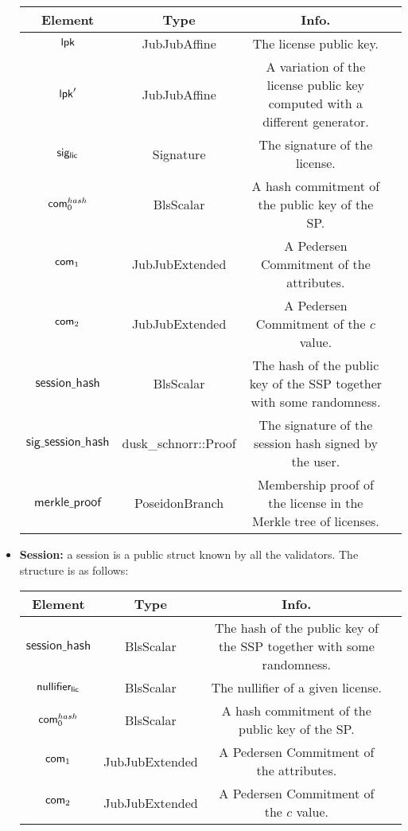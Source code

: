 \begin{itemize}
    \begin{center}
        \begin{tabular}{ |c|c|c|c| } 
        \hline
        \textbf{Element} & \textbf{Type} & \textbf{Info.} \\
        \hline
        $\mathsf{lpk}$ & JubJubAffine & The license public key.\\ 
        $\mathsf{lpk}'$ & JubJubAffine & A variation of the license public key computed with a different generator.\\ 
        $\mathsf{sig_{lic}}$ & Signature & The signature of the license. \\ 
        $\mathsf{com}_0^{hash}$ & BlsScalar & A hash commitment of the public key of the SP. \\ 
        $\mathsf{com}_1$ & JubJubExtended & A Pedersen Commitment of the attributes. \\ 
        $\mathsf{com}_2$ & JubJubExtended & A Pedersen Commitment of the $c$ value. \\ 
        $\mathsf{session\_hash}$ & BlsScalar & The hash of the public key of the SSP together with some randomness. \\ 
        $\mathsf{sig\_session\_hash}$ & dusk\_schnorr::Proof & The signature of the session hash signed by the user. \\ 
        $\mathsf{merkle\_proof}$ & PoseidonBranch & Membership proof of the license in the Merkle tree of licenses. \\ 

        \hline
        \end{tabular}
    \end{center}

    \item \textbf{Session:} a session is a public struct known by all the validators. The structure is as follows:

    \begin{center}
        \begin{tabular}{ |c|c|c|c| } 
        \hline
        \textbf{Element} & \textbf{Type} & \textbf{Info.} \\
        \hline
        $\mathsf{session\_hash}$ & BlsScalar & The hash of the public key of the SSP together with some randomness. \\ 
        $\mathsf{nullifier_{lic}}$ & BlsScalar & The nullifier of a given license. \\ 
        $\mathsf{com}_0^{hash}$ & BlsScalar & A hash commitment of the public key of the SP. \\ 
        $\mathsf{com}_1$ & JubJubExtended & A Pedersen Commitment of the attributes. \\ 
        $\mathsf{com}_2$ & JubJubExtended & A Pedersen Commitment of the $c$ value. \\ 
        \hline
        \end{tabular}
    \end{center}


\end{itemize}
